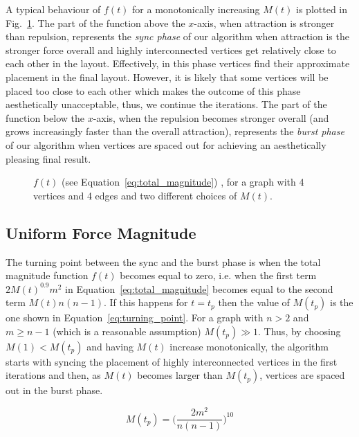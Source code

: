\documentclass{llncs}
\begin{document}
A typical behaviour of $f(t)$ for a monotonically increasing $M(t)$ is plotted in Fig.~\ref{fig:total_magnitude}. The part of the function above the $x$-axis, when attraction is stronger than repulsion, represents the \emph{sync phase} of our algorithm when attraction is the stronger force overall and highly interconnected vertices get relatively close to each other in the layout.  Effectively, in this phase vertices find their approximate placement in the final layout. However, it is likely that some vertices will be placed too close to each other which makes the outcome of this phase aesthetically unacceptable, thus, we continue the iterations. The part of the function below the $x$-axis, when the repulsion becomes stronger overall (and grows increasingly faster than the overall attraction), represents the \emph{burst phase} of our algorithm when vertices are spaced out for achieving an aesthetically pleasing final result.

\begin{figure}
\centering
{}
\caption{$f(t)$ (see Equation~\eqref{eq:total_magnitude}) , for a graph with 4 vertices and 4 edges and two different choices of $M(t)$.}
\label{fig:total_magnitude}
\end{figure}

\subsection{Uniform Force Magnitude} \label{sec:magnitude}

The turning point between the sync and the burst phase is when the total magnitude function $f(t)$ becomes equal to zero, i.e. when the first term $2M(t)^{0.9}m^2$ in Equation~\eqref{eq:total_magnitude} becomes equal to the second term $M(t)n(n-1)$. If this happens for $t = t_p$ then the value of $M(t_p)$ is the one shown in Equation~\eqref{eq:turning_point}. For a graph with $n > 2$ and $m \ge n-1$ (which is a reasonable assumption) $M(t_p) \gg 1$. Thus, by choosing $M(1)<M(t_p)$ and having $M(t)$ increase monotonically, the algorithm starts with syncing the placement of highly interconnected vertices in the first iterations and then, as $M(t)$ becomes larger than $M(t_p)$, vertices are spaced out in the burst phase.

\begin{equation}
\label{eq:turning_point}
M(t_p) = \Bigg(\frac{2m^2}{n(n-1)}\Bigg)^{10}
\end{equation}
\end{document}
